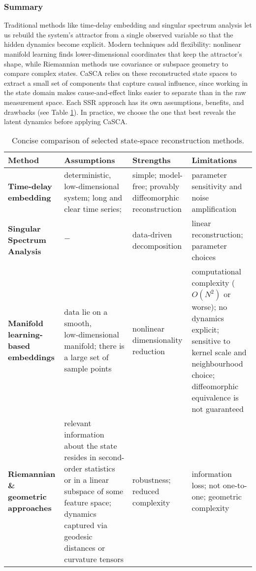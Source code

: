 \documentclass[14pt]{extarticle}
\begin{document}
	\subsubsection*{Summary}
	
	Traditional methods like time‐delay embedding and singular spectrum analysis let us rebuild the system’s attractor from a single observed variable so that the hidden dynamics become explicit.  
	Modern techniques add flexibility: nonlinear manifold learning finds lower‐dimensional coordinates that keep the attractor’s shape, while Riemannian methods use covariance or subspace geometry to compare complex states.  
	CaSCA relies on these reconstructed state spaces to extract a small set of components that capture causal influence, since working in the state domain makes cause‐and‐effect links easier to separate than in the raw measurement space.  
	Each SSR approach has its own assumptions, benefits, and drawbacks (see Table \ref{tab:ssr_selected}). In practice, we choose the one that best reveals the latent dynamics before applying CaSCA.
	
	\begin{table}[bhtp]
		\centering
		\renewcommand{\arraystretch}{1.25} %
		\begin{tabularx}{\textwidth}{
				>{\raggedright\arraybackslash}p{3.3cm}   %
				>{\raggedright\arraybackslash}X           %
				>{\raggedright\arraybackslash}X           %
				>{\raggedright\arraybackslash}X}          %
			\toprule
			\textbf{Method} & \textbf{Assumptions} & \textbf{Strengths} & \textbf{Limitations} \\
			\midrule
			\textbf{Time-delay embedding} &
			deterministic, low-dimensional system; long and clear time series;  &
			simple; model-free; provably diffeomorphic reconstruction &
			parameter sensitivity and noise amplification \\[0.3em] \hline
			
			\textbf{Singular Spectrum Analysis} &
			$-$ &
			data-driven decomposition &
			linear reconstruction; parameter choices \\[0.3em] \hline
			
			\textbf{Manifold learning-based embeddings} &
			data lie on a smooth, low‑dimensional manifold; there is a large set of sample points &
			nonlinear dimensionality reduction &
			computational complexity ($O(N^2)$ or worse); no dynamics explicit; sensitive to kernel scale and neighbourhood choice; diffeomorphic equivalence is not guaranteed \\[0.3em] \hline
			
			\textbf{Riemannian \& geometric approaches} &
			relevant information about the state resides in second-order statistics or in a linear subspace of some feature space; dynamics captured via geodesic distances or curvature tensors &
			robustness; reduced complexity &
			information loss; not one-to-one; geometric complexity \\
			\bottomrule
		\end{tabularx}
		\caption{Concise comparison of selected state‑space reconstruction methods.}
		\label{tab:ssr_selected}
	\end{table}
	
\end{document}
